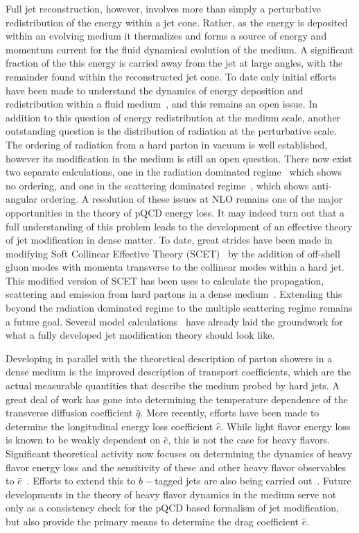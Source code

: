 Full jet reconstruction, however, involves more than simply a perturbative redistribution of the energy within a jet cone.
Rather, as the energy is deposited within an evolving medium it thermalizes and forms a source of energy and momentum current for the fluid dynamical evolution of the medium. 
A significant fraction of the this energy is carried away from the jet at large angles, with the remainder found 
within the reconstructed jet cone. To date only initial efforts have been made to understand the dynamics of energy deposition and redistribution 
within a fluid medium~\cite{Neufeld:2009ep,Qin:2009uh}, and this remains an open issue. 
In addition to this question of energy redistribution at the medium scale, another outstanding question is the distribution of radiation at the perturbative scale. The ordering of radiation from a hard parton in vacuum is well established, however its modification in the medium is still an open question. There now exist two separate calculations, one in the radiation dominated regime~\cite{Fickinger:2013xwa} which shows no ordering, and one in the 
scattering dominated regime~\cite{Armesto:2011ir}, which shows anti-angular ordering. A resolution of these issues at NLO remains one of the major opportunities in the theory of 
pQCD energy loss. It may indeed turn out that a full understanding of this problem leads to the development of an effective theory of jet modification in dense matter. To date, 
great strides have been made in modifying Soft Collinear Effective Theory (SCET)~\cite{Bauer:2000yr,Bauer:2001yt,Bauer:2002nz} by the addition of off-shell gluon modes with momenta transverse to the collinear modes within a hard jet. 
This modified version of SCET has been uses to calculate the 
propagation, scattering and emission from hard partons in a dense medium~\cite{Idilbi:2008vm, DEramo:2010ak,Ovanesyan:2011xy}. Extending this beyond the radiation dominated regime to the multiple scattering regime remains a future goal. Several model calculations~\cite{CasalderreySolana:2011rq,Qin:2010mn} have already laid the groundwork for what a fully developed jet modification theory should look like. 


Developing in parallel with the theoretical description of parton showers in a dense medium is the improved description of transport coefficients, which are the actual measurable quantities that describe the medium probed by hard jets. A great deal of work has gone into determining the temperature dependence of the transverse diffusion coefficient $\hat{q}$. 
More recently, efforts have been made to determine the longitudinal energy loss coefficient $\hat{e}$. 
While light flavor energy loss is known to be weakly dependent on $\hat{e}$, this is not the case for 
heavy flavors. 
Significant theoretical activity now focuses on determining the dynamics of heavy flavor energy loss 
and the sensitivity of these and other heavy flavor observables
to $\hat{e}$~\cite{Qin:2009gw,Djordjevic:2013pba,Abir:2014sxa}. 
Efforts to extend this to $b-$tagged jets are also being carried out~\cite{Huang:2013vaa}. 
Future developments in the theory of heavy flavor dynamics in the medium serve not only as a consistency check for the pQCD based formalism of jet modification, but also provide the 
primary means to determine the drag coefficient $\hat{e}$.


